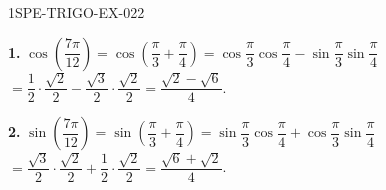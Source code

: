 \begin{corrige}{1SPE-TRIGO-EX-022}

\textbf{1.} $\cos\!\left(\dfrac{7\pi}{12}\right) = \cos\!\left(\dfrac{\pi}{3}+\dfrac{\pi}{4}\right) = \cos\dfrac{\pi}{3}\cos\dfrac{\pi}{4} - \sin\dfrac{\pi}{3}\sin\dfrac{\pi}{4}$
$= \dfrac{1}{2}\cdot\dfrac{\sqrt{2}}{2} - \dfrac{\sqrt{3}}{2}\cdot\dfrac{\sqrt{2}}{2} = \dfrac{\sqrt{2}-\sqrt{6}}{4}$.

\textbf{2.} $\sin\!\left(\dfrac{7\pi}{12}\right) = \sin\!\left(\dfrac{\pi}{3}+\dfrac{\pi}{4}\right) = \sin\dfrac{\pi}{3}\cos\dfrac{\pi}{4} + \cos\dfrac{\pi}{3}\sin\dfrac{\pi}{4}$
$= \dfrac{\sqrt{3}}{2}\cdot\dfrac{\sqrt{2}}{2} + \dfrac{1}{2}\cdot\dfrac{\sqrt{2}}{2} = \dfrac{\sqrt{6}+\sqrt{2}}{4}$.

\end{corrige}
